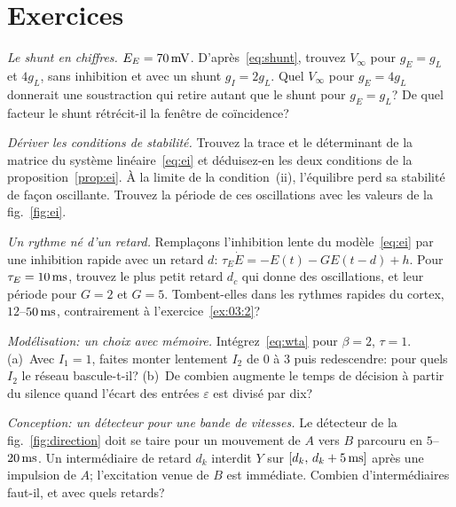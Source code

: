 \section{Exercices}

\begin{exercise}[\lvlA]
\label{ex:03:1}
\emph{Le shunt en chiffres.} $E_E=70\,\text{mV}$. D'après~\eqref{eq:shunt}, trouvez $V_\infty$ pour $g_E=g_L$ et $4g_L$, sans inhibition et avec un shunt $g_I=2g_L$. Quel $V_\infty$ pour $g_E=4g_L$ donnerait une soustraction qui retire autant que le shunt pour $g_E=g_L$? De quel facteur le shunt rétrécit-il la fenêtre de coïncidence?
\end{exercise}

\begin{exercise}[\lvlB]
\label{ex:03:2}
\emph{Dériver les conditions de stabilité.} Trouvez la trace et le déterminant de la matrice du système linéaire~\eqref{eq:ei} et déduisez-en les deux conditions de la proposition~\ref{prop:ei}. À la limite de la condition~(ii), l'équilibre perd sa stabilité de façon oscillante. Trouvez la période de ces oscillations avec les valeurs de la fig.~\ref{fig:ei}.
\end{exercise}

\begin{exercise}[\lvlB]
\label{ex:03:3}
\emph{Un rythme né d'un retard.} Remplaçons l'inhibition lente du modèle~\eqref{eq:ei} par une inhibition rapide avec un retard $d$: $\tau_E\dot E=-E(t)-GE(t-d)+h$. Pour $\tau_E=10\,\text{ms}$, trouvez le plus petit retard $d_c$ qui donne des oscillations, et leur période pour $G=2$ et $G=5$. Tombent-elles dans les rythmes rapides du cortex, $12$--$50\,\text{ms}$, contrairement à l'exercice~\ref{ex:03:2}?
\end{exercise}

\begin{exercise}[\lvlB]
\label{ex:03:4}
\emph{Modélisation: un choix avec mémoire.} Intégrez~\eqref{eq:wta} pour $\beta=2$, $\tau=1$. (a)~Avec $I_1=1$, faites monter lentement $I_2$ de $0$ à $3$ puis redescendre: pour quels $I_2$ le réseau bascule-t-il? (b)~De combien augmente le temps de décision à partir du silence quand l'écart des entrées $\varepsilon$ est divisé par dix?
\end{exercise}

\begin{exercise}[\lvlB]
\label{ex:03:5}
\emph{Conception: un détecteur pour une bande de vitesses.} Le détecteur de la fig.~\ref{fig:direction} doit se taire pour un mouvement de $A$ vers $B$ parcouru en $5$--$20\,\text{ms}$. Un intermédiaire  de retard $d_k$ interdit $Y$ sur $[d_k,\,d_k+5\,\text{ms}]$ après une impulsion de $A$; l'excitation venue de $B$ est immédiate. Combien d'intermédiaires faut-il, et avec quels retards?
\end{exercise}

